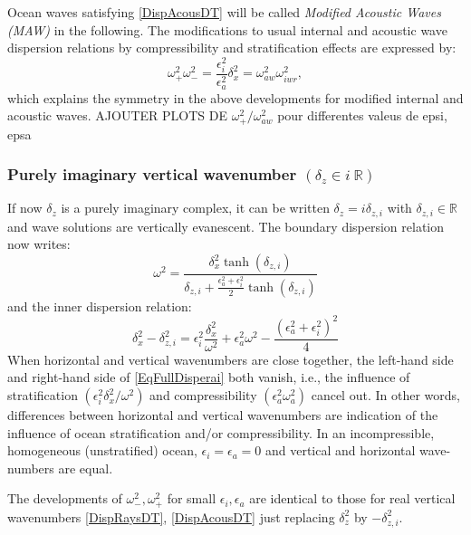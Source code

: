 \documentclass[a4paper,11pt]{article}
\begin{document}
Ocean waves satisfying \ref{DispAcousDT} will be called \textit{Modified Acoustic Waves (MAW)} in the following. The modifications to usual internal and acoustic wave dispersion relations by compressibility and stratification effects are expressed by:
\[
\omega_+^2\omega_-^2=\frac{\epsilon_i^2}{\epsilon_a^2}\delta_x^2=\omega_{aw}^2\omega_{iwr}^2,
\]
which explains the symmetry in the above developments for modified internal and acoustic waves.
{\color{red}AJOUTER PLOTS DE $\omega_+^2/\omega_{aw}^2$ pour differentes valeus de epsi, epsa}

\subsubsection{Purely imaginary vertical wavenumber $(\delta_z\in i\ 
\mathbb{R})$}
\label{subsubsectioniR}

If now $\delta_z$ is a purely imaginary complex, it can be written $\delta_z=i\delta_{z,i}$ with $\delta_{z,i}\in\mathbb{R}$ and wave solutions are vertically evanescent. The boundary dispersion relation now writes:
\begin{equation}
\label{EqFullDisperbi}
\omega^2=\frac{\delta_x^2\tanh(\delta_{z,i})}
{\delta_{z,i}+\frac{\epsilon_a^2+\epsilon_i^2}{2}\tanh(\delta_{z,i})}
\end{equation}
and the inner dispersion relation:
%
\begin{equation}
	\label{EqFullDisperai}
 		\delta_x^2-\delta_{z,i}^2 =\epsilon_i^2\frac{\delta_x^2}
 			{\omega^2}+\epsilon_a^2\omega^2-\frac{(\epsilon_a^2+\epsilon_i^2)^2}{4}
\end{equation}
%
When horizontal and vertical wavenumbers are close together, the left-hand side and  right-hand side of  \ref{EqFullDisperai} both vanish, i.e., the influence of stratification $(\epsilon_i^2\delta_x^2/\omega^2)$ and compressibility $(\epsilon_a^2\omega_a^2)$ cancel out. In other words, differences between horizontal and vertical wavenumbers are indication of the influence of ocean stratification and/or compressibility. In an incompressible, homogeneous (unstratified) ocean, $\epsilon_i=\epsilon_a=0$ and vertical and horizontal wave-numbers are equal.

The developments of $\omega_-^2, \omega_+^2$ for small $\epsilon_i, \epsilon_a$ are identical to those for real vertical wavenumbers \ref{DispRaysDT}, \ref{DispAcousDT} just replacing $\delta_z^2$ by $-\delta_{z,i}^2$.
\end{document}
